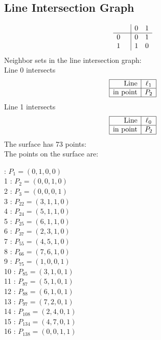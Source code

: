 \documentclass{article}
\begin{document}
{\subsection*{Line Intersection Graph}
{\arraycolsep=1pt
$$
\begin{array}{rr|*{2}r}
 &  & 0 & 1\\
\hline
0 &  & 0 & 1\\
1 &  & 1 & 0\\
\end{array}
$$
}%
Neighbor sets in the line intersection graph:\\
Line 0 intersects 
$$
\begin{array}{|r*{1}{|c}|}
\hline
\mbox{Line}  & \ell_{1}\\
\hline
\mbox{in point}  & P_{2}\\
\hline
\end{array}
$$
Line 1 intersects 
$$
\begin{array}{|r*{1}{|c}|}
\hline
\mbox{Line}  & \ell_{0}\\
\hline
\mbox{in point}  & P_{2}\\
\hline
\end{array}
$$
The surface has 73 points:\\
The points on the surface are:\\
\begin{multicols}{3}
 : $P_{1}=( 0, 1, 0, 0 )$\\
1 : $P_{2}=( 0, 0, 1, 0 )$\\
2 : $P_{3}=( 0, 0, 0, 1 )$\\
3 : $P_{22}=( 3, 1, 1, 0 )$\\
4 : $P_{24}=( 5, 1, 1, 0 )$\\
5 : $P_{25}=( 6, 1, 1, 0 )$\\
6 : $P_{37}=( 2, 3, 1, 0 )$\\
7 : $P_{55}=( 4, 5, 1, 0 )$\\
8 : $P_{66}=( 7, 6, 1, 0 )$\\
9 : $P_{75}=( 1, 0, 0, 1 )$\\
10 : $P_{85}=( 3, 1, 0, 1 )$\\
11 : $P_{87}=( 5, 1, 0, 1 )$\\
12 : $P_{88}=( 6, 1, 0, 1 )$\\
13 : $P_{97}=( 7, 2, 0, 1 )$\\
14 : $P_{108}=( 2, 4, 0, 1 )$\\
15 : $P_{134}=( 4, 7, 0, 1 )$\\
16 : $P_{138}=( 0, 0, 1, 1 )$\\

\end{multicols}}
\end{document}
